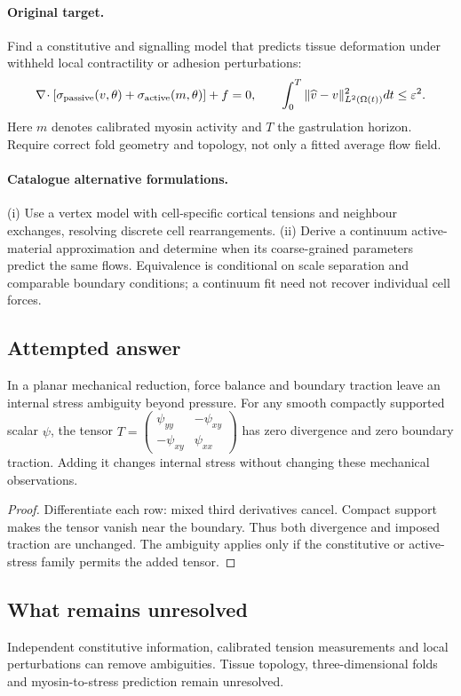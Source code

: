 \documentclass[11pt]{article}
\begin{document}
\paragraph{Original target.}
Find a constitutive and signalling model that predicts tissue deformation under withheld local contractility or adhesion perturbations:
\[
\nabla\!\cdot[\sigma_{\rm passive}(v,\theta)+\sigma_{\rm active}(m,\theta)]+f=0,
\qquad
\int_0^T\|\widehat v-v\|_{L^2(\Omega(t))}^2dt\leq\varepsilon^2.
\]
Here $m$ denotes calibrated myosin activity and $T$ the gastrulation horizon. Require correct fold geometry and topology, not only a fitted average flow field.
\paragraph{Catalogue alternative formulations.}
(i) Use a vertex model with cell-specific cortical tensions and neighbour exchanges, resolving discrete cell rearrangements. (ii) Derive a continuum active-material approximation and determine when its coarse-grained parameters predict the same flows. Equivalence is conditional on scale separation and comparable boundary conditions; a continuum fit need not recover individual cell forces.
\subsection{Attempted answer}
\begin{proposition}
In a planar mechanical reduction, force balance and boundary traction leave an internal stress ambiguity beyond pressure. For any smooth compactly supported scalar $\psi$, the tensor $T=\left(\begin{smallmatrix}\psi_{yy}&-\psi_{xy}\\-\psi_{xy}&\psi_{xx}\end{smallmatrix}\right)$ has zero divergence and zero boundary traction. Adding it changes internal stress without changing these mechanical observations.
\end{proposition}
\begin{proof}
Differentiate each row: mixed third derivatives cancel. Compact support makes the tensor vanish near the boundary. Thus both divergence and imposed traction are unchanged. The ambiguity applies only if the constitutive or active-stress family permits the added tensor.
\end{proof}
\subsection{What remains unresolved}
Independent constitutive information, calibrated tension measurements and local perturbations can remove ambiguities. Tissue topology, three-dimensional folds and myosin-to-stress prediction remain unresolved.
\end{document}
